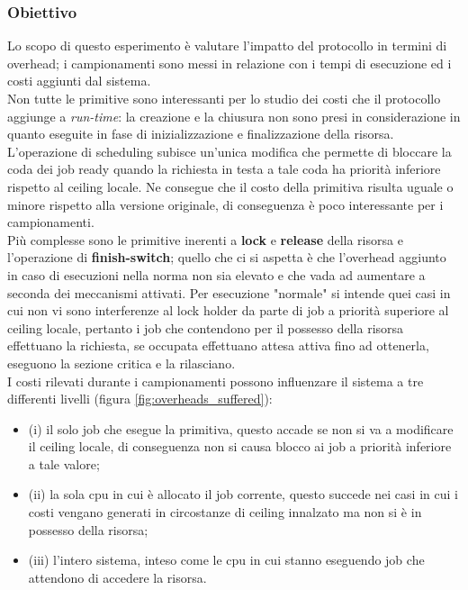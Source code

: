\subsubsection{Obiettivo}
\label{sec:overhead_ob}

\noindent Lo scopo di questo esperimento è valutare l'impatto del protocollo in termini di overhead; i campionamenti sono messi in relazione con i tempi di esecuzione ed i costi aggiunti dal sistema.\\

\noindent Non tutte le primitive sono interessanti per lo studio dei costi che il protocollo aggiunge a \textit{run-time}: la creazione e la chiusura non sono presi in considerazione in quanto eseguite in fase di inizializzazione e finalizzazione della risorsa.\\

\noindent L'operazione di scheduling subisce un'unica modifica che permette di bloccare la coda dei job ready quando la richiesta in testa a tale coda ha priorità inferiore rispetto al ceiling locale. Ne consegue che il costo della primitiva risulta uguale o minore rispetto alla versione originale, di conseguenza è poco interessante per i campionamenti.\\

\noindent Più complesse sono le primitive inerenti a \textbf{lock} e \textbf{release} della risorsa e l'operazione di \textbf{finish-switch}; quello che ci si aspetta è che l'overhead aggiunto in caso di esecuzioni nella norma non sia elevato e che vada ad aumentare a seconda dei meccanismi attivati. Per esecuzione "normale" si intende quei casi in cui non vi sono interferenze al lock holder da parte di job a priorità superiore al ceiling locale, pertanto i job che contendono per il possesso della risorsa effettuano la richiesta, se occupata effettuano attesa attiva fino ad ottenerla, eseguono la sezione critica e la rilasciano.\\

\noindent I costi rilevati durante i campionamenti possono influenzare il sistema a tre differenti livelli (figura \ref{fig:overheads_suffered}):\\

\begin{itemize}
	\item {\color{red} (i)} il solo job che esegue la primitiva, questo accade se non si va a modificare il ceiling locale, di conseguenza non si causa blocco ai job a priorità inferiore a tale valore;
	\item {\color{red} (ii)} la sola cpu in cui è allocato il job corrente, questo succede nei casi in cui i costi vengano generati in circostanze di ceiling innalzato ma non si è in possesso della risorsa;
	\item {\color{red} (iii)} l'intero sistema, inteso come le cpu in cui stanno eseguendo job che attendono di accedere la risorsa.
\end{itemize}

